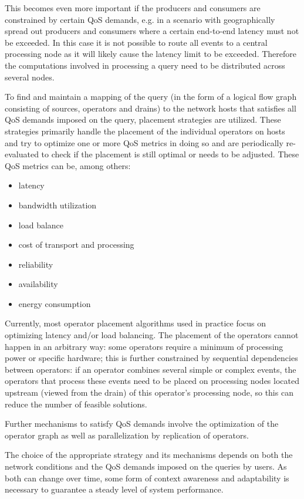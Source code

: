 This becomes even more important if the producers and consumers are constrained by certain QoS demands, e.g. in a scenario with geographically spread out producers and consumers where a certain end-to-end latency must not be exceeded. In this case it is not possible to route all events to a central processing node as it will likely cause the latency limit to be exceeded. Therefore the computations involved in processing a query need to be distributed across several nodes.

To find and maintain a mapping of the query (in the form of a logical flow graph consisting of sources, operators and drains) to the network hosts that satisfies all QoS demands imposed on the query, placement strategies are utilized. 
These strategies primarily handle the placement of the individual operators on hosts and try to optimize one or more QoS metrics in doing so and are periodically re-evaluated to check if the placement is still optimal or needs to be adjusted. 
These QoS metrics can be, among others: 
\begin{itemize}
\item latency 
\item bandwidth utilization
\item load balance
\item cost of transport and processing
\item reliability
\item availability
\item energy consumption
\end{itemize}

Currently, most operator placement algorithms used in practice focus on optimizing latency and/or load balancing. 
The placement of the operators cannot happen in an arbitrary way: some operators require a minimum of processing power or specific hardware; this is further constrained by sequential dependencies between operators: if an operator combines several simple or complex events, the operators that process these events need to be placed on processing nodes located upstream (viewed from the drain) of this operator's processing node, so this can reduce the number of feasible solutions. 

Further mechanisms to satisfy QoS demands involve the optimization of the operator graph as well as parallelization by replication of operators.

The choice of the appropriate strategy and its mechanisms depends on both the network conditions and the QoS demands imposed on the queries by users. As both can change over time, some form of context awareness and adaptability is necessary to guarantee a steady level of system performance.


